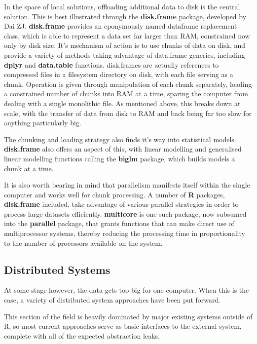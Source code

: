 In the space of local solutions, offloading additional data to disk is the central solution.
This is best illustrated through the \textbf{disk.frame} package, developed by Dai ZJ.
\textbf{disk.frame} provides an eponymously named dataframe replacement class, which is able to represent a data  set far larger than RAM, constrained now only by disk size\cite{zj20}.
It's mechanism of action is to use chunks of data on disk, and provide a variety of methods taking advantage of data.frame generics, including \textbf{dplyr} and \textbf{data.table} functions.
disk.frames are actually references to compressed files in a filesystem directory on disk, with each file serving as a chunk.
Operation is given through manipulation of each chunk separately, loading a constrained number of chunks into RAM at a time, sparing the computer from dealing with a single monolithic file\cite{zj19:_inges_data}.
As mentioned above, this breaks down at scale, with the transfer of data from disk to RAM and back being far too slow for anything particularly big.

The chunking and loading strategy also finds it's way into statistical models.
\textbf{disk.frame} also offers an aspect of this, with linear modelling and generalised linear modelling functions calling the \textbf{biglm} package, which builds models a chunk at a time.

It is also worth bearing in mind that parallelism manifests itself within the single computer and works well for chunk processing.
A number of \textbf{R} packages, \textbf{disk.frame} included, take advantage of various parallel strategies in order to process large datasets efficiently.
\textbf{multicore} is one such package, now subsumed into the \textbf{parallel} package, that grants functions that can make direct use of multiprocessor systems, thereby reducing the processing time in proportionality to the number of processors available on the system.

\subsection{Distributed Systems}

At some stage however, the data gets too big for one computer.
When this is the case, a variety of distributed system approaches have been put forward.

This section of the field is heavily dominated by major existing systems outside of R, so most current approaches serve as basic interfaces to the external system, complete with all of the expected abstraction leaks\cite{spolsky2002abstraction}.

